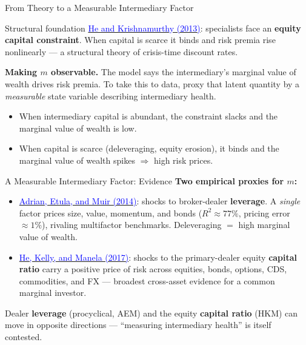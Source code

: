 \documentclass{beamer}
\begin{document}
\begin{frame}{From Theory to a Measurable Intermediary Factor}
\begin{block}{Structural foundation}
\href{https://doi.org/10.1257/aer.103.2.732}{\textcolor{blue}{He and Krishnamurthy (2013)}}: specialists face an \textbf{equity capital constraint}. When capital is scarce it binds and risk premia rise \alert{nonlinearly} --- a structural theory of crisis-time discount rates.
\end{block}
\textbf{Making $m$ observable.} The model says the intermediary's marginal value of wealth drives risk premia. To take this to data, proxy that latent quantity by a \emph{measurable} state variable describing intermediary health.
\begin{itemize}
  \item When intermediary capital is abundant, the constraint slacks and the marginal value of wealth is low.
  \item When capital is scarce (deleveraging, equity erosion), it binds and the marginal value of wealth spikes $\Rightarrow$ high risk prices.
\end{itemize}
\end{frame}

\begin{frame}{A Measurable Intermediary Factor: Evidence}
\textbf{Two empirical proxies for $m$:}
\begin{itemize}
  \item \href{https://doi.org/10.1111/jofi.12189}{\textcolor{blue}{Adrian, Etula, and Muir (2014)}}: shocks to broker-dealer \textbf{leverage}. A \emph{single} factor prices size, value, momentum, and bonds ($R^2 \approx 77\%$, pricing error $\approx 1\%$), rivaling multifactor benchmarks. Deleveraging $=$ high marginal value of wealth.
  \item \href{https://doi.org/10.1016/j.jfineco.2017.08.002}{\textcolor{blue}{He, Kelly, and Manela (2017)}}: shocks to the primary-dealer equity \textbf{capital ratio} carry a \alert{positive} price of risk across equities, bonds, options, CDS, commodities, and FX --- broadest cross-asset evidence for a common marginal investor.
\end{itemize}
\begin{tcolorbox}[colback=postit,colframe=red!60!black,title=Live measurement debate]
Dealer \textbf{leverage} (procyclical, AEM) and the equity \textbf{capital ratio} (HKM) can move in \alert{opposite} directions --- ``measuring intermediary health'' is itself contested.
\end{tcolorbox}
\end{frame}
\end{document}
